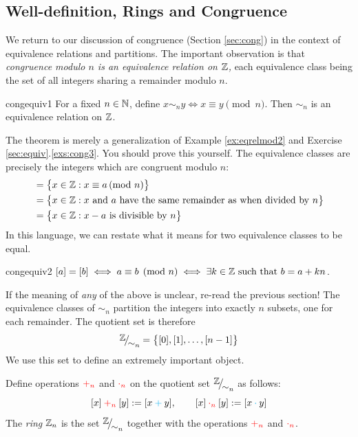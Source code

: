 \clearpage


\subsection{Well-definition, Rings and Congruence}\label{sec:welldefn}

We return to our discussion of congruence (Section \ref{sec:cong}) in the context of equivalence relations and partitions. The important observation is that \emph{congruence modulo $n$ is an equivalence relation on $\mathbb{Z}$,} each equivalence class being the set of all integers sharing a remainder modulo $n$.

\begin{thm}{}{congequiv1}
	For a fixed $n\in\mathbb{N}$, define $x\sim_n y\iff x\equiv y\pmod n$. Then $\sim_n$ is an equivalence relation on $\mathbb{Z}$.
\end{thm}

The theorem is merely a generalization of Example \ref{ex:eqrelmod2} and Exercise \ref*{sec:equiv}.\ref{exs:cong3}. You should prove this yourself. The equivalence classes are precisely the integers which are congruent modulo $n$:
\begin{align*}
	[a]&=\bigl\{x\in\Z:x\equiv a\spmod n\bigr\}\\
	&=\bigl\{x\in\Z:x\text{ and $a$ have the same remainder as when divided by $n$}\bigr\}\\
	&=\bigl\{x\in\Z:x-a\text{ is divisible by $n$}\bigr\}
\end{align*}
In this language, we can restate what it means for two equivalence classes to be equal.

\begin{lemm}{}{congequiv2}
	$[a]=[b]\iff a\equiv b\pmod n\iff \exists k\in\mathbb{Z}\text{ such that }b=a+kn$.
\end{lemm}

If the meaning of \emph{any} of the above is unclear, re-read the previous section! The equivalence classes of $\sim_n$ partition the integers  into  exactly $n$ subsets, one for each remainder. The quotient set is therefore
\[
	\quotient \Z{\sim_n}=\bigl\{[0],[1],\ldots,[n-1]\bigr\}
\]
We use this set to define an extremely important object.

\begin{defn}{}{}
	Define operations $\textcolor{red}{+_n}$ and $\textcolor{red}{\cdot_n}$ on the quotient set $\quotient\Z{\sim_n}$ as follows:
	\[
		[x]\mathbin{\textcolor{red}{+_n}}[y]
		:=[x\mathbin{\textcolor{cyan}{+}}y],\qquad 
		[x]\mathbin{\textcolor{red}{\cdot_n}}[y]
		:=[x\mathbin{\textcolor{cyan}{\cdot}} y]
	\]
	The \emph{ring} $\mathbb{Z}_n$ is the set $\quotient\Z{\sim_n}$ together with the operations $\textcolor{red}{+_n}$ and $\textcolor{red}{\cdot_n}$.
\end{defn}

